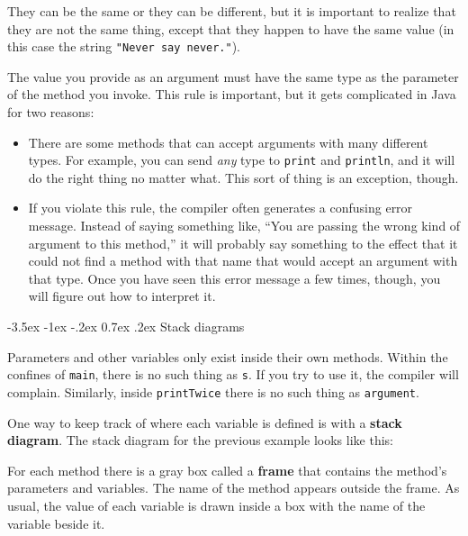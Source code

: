 \documentclass{book}
\makeatletter
\renewcommand{\section}{\@startsection 
    {section} {1} {0mm}%
    {-3.5ex \@plus -1ex \@minus -.2ex}%
    {0.7ex \@plus.2ex}%
    {\normalfont\Large\bfseries}}
\makeatother
\begin{document}
They can be the same or they can be different, but it is important
to realize that they are not the same thing, except that they happen
to have the same value (in this case the string {\tt "Never say never."}).

The value you provide as an argument must have the same type as
the parameter of the method you invoke.  This rule is
important, but it gets complicated in Java for two reasons:

\begin {itemize}

\item There are some methods that can accept arguments with many
different types.  For example, you can send {\em any} type to
{\tt print} and {\tt println}, and it will do the right thing
no matter what.  This sort of thing is an exception, though.

\item If you violate this rule, the compiler often generates
a confusing error message.  Instead of saying something like,
``You are passing the wrong kind of argument to this method,''
it will probably say something to the effect that it could
not find a method with that name that would accept an argument
with that type.  Once you have seen this error message a few
times, though, you will figure out how to interpret it.

\end{itemize}


\section {Stack diagrams}
\label{stack}

Parameters and other
variables only exist inside their own methods.  Within the
confines of {\tt main}, there is no such thing as {\tt s}.
If you try to use it, the compiler will complain.  Similarly,
inside {\tt printTwice} there is no such thing as {\tt argument}.

One way to keep track of where each variable is defined is
with a {\bf stack diagram}.  The stack diagram for the previous
example looks like this:


For each method there is a gray box called a {\bf frame} that contains
the method's parameters and variables.  The name of the method
appears outside the frame.  As usual, the value of each variable
is drawn inside a box with the name of the variable beside it.
\end{document}
